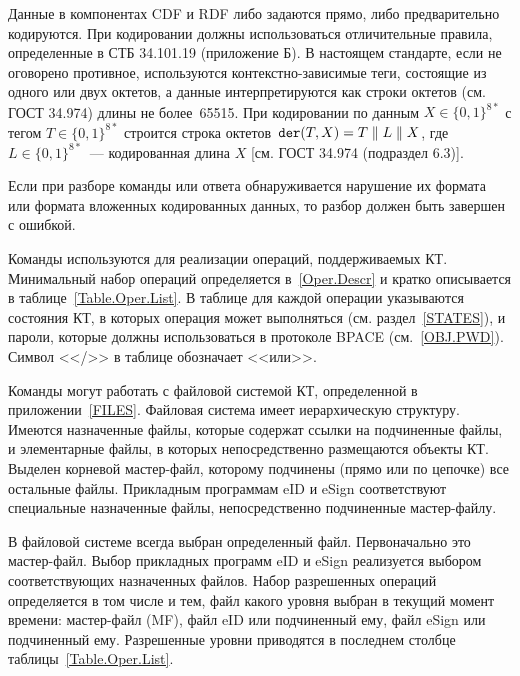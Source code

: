 Данные в компонентах CDF и RDF либо задаются прямо, либо предварительно кодируются. 
При кодировании должны использоваться отличительные правила, определенные в СТБ 34.101.19 
(приложение Б). В настоящем стандарте, если не оговорено противное, используются 
контекстно-зависимые теги, состоящие из одного или двух октетов, а данные 
интерпретируются как строки октетов (см. ГОСТ 34.974) длины не более~65515. 
При кодировании по данным $X\in\{0,1\}^{8*}$ с тегом $T\in\{0,1\}^{8*}$ строится 
строка октетов~$\texttt{der}(T, X) = T \parallel L \parallel X$, 
где $L\in\{0,1\}^{8*}$~--- кодированная длина $X$ [см. ГОСТ 34.974 (подраздел 
6.3)].  

Если при разборе команды или ответа обнаруживается нарушение их 
формата или формата вложенных кодированных данных, то разбор 
должен быть завершен с ошибкой. 

Команды используются для реализации операций, поддерживаемых КТ.
Минимальный набор операций определяется в~\ref{Oper.Descr}
и кратко описывается в таблице~\ref{Table.Oper.List}. 
%
В таблице для каждой операции указываются состояния КТ, 
в которых операция может выполняться (см. раздел~\ref{STATES}),
и пароли, которые должны использоваться в протоколе BPACE (см.~\ref{OBJ.PWD}).  
%
Символ <</>> в таблице обозначает <<или>>.

Команды могут работать с файловой системой КТ, определенной в 
приложении~\ref{FILES}. Файловая система имеет иерархическую структуру.
Имеются назначенные файлы, которые содержат ссылки на подчиненные файлы,
и элементарные файлы, в которых непосредственно размещаются объекты КТ.
Выделен корневой мастер-файл, которому подчинены (прямо или по цепочке)
все остальные файлы. Прикладным программам eID и eSign соответствуют 
специальные назначенные файлы, непосредственно подчиненные мастер-файлу.

В файловой системе всегда выбран определенный файл. Первоначально это 
мастер-файл. Выбор прикладных программ eID и eSign реализуется 
выбором соответствующих назначенных файлов. 
Набор разрешенных операций определяется в том числе и тем, файл какого уровня
выбран в текущий момент времени: мастер-файл (MF), файл eID или подчиненный 
ему, файл eSign или подчиненный ему. Разрешенные уровни приводятся в последнем 
столбце таблицы~\ref{Table.Oper.List}.

